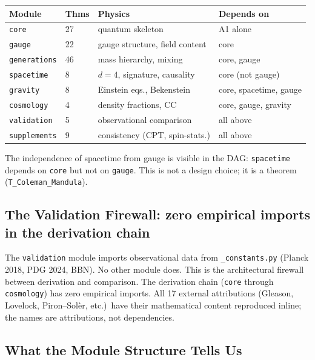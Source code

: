 \documentclass[11pt]{article}
\begin{document}
\smallskip
\begin{center}
\small
\begin{tabular}{llll}
\toprule
\textbf{Module} & \textbf{Thms} & \textbf{Physics} & \textbf{Depends on} \\
\midrule
\texttt{core} & 27 & quantum skeleton & A1 alone \\
\texttt{gauge} & 22 & gauge structure, field content & core \\
\texttt{generations} & 46 & mass hierarchy, mixing & core, gauge \\
\texttt{spacetime} & 8 & $d=4$, signature, causality & core (not gauge) \\
\texttt{gravity} & 8 & Einstein eqs., Bekenstein & core, spacetime, gauge \\
\texttt{cosmology} & 4 & density fractions, CC & core, gauge, gravity \\
\texttt{validation} & 5 & observational comparison & all above \\
\texttt{supplements} & 9 & consistency (CPT, spin-stats.) & all above \\
\bottomrule
\end{tabular}
\end{center}
\smallskip

The independence of spacetime from gauge is visible in the DAG: \texttt{spacetime} depends on \texttt{core} but not on \texttt{gauge}.  This is not a design choice; it is a theorem (\texttt{T\_Coleman\_Mandula}).


\subsection{The Validation Firewall: zero empirical imports in the derivation chain}

The \texttt{validation} module imports observational data from \texttt{\_constants.py} (Planck 2018, PDG 2024, BBN).  No other module does.  This is the architectural firewall between derivation and comparison.  The derivation chain (\texttt{core} through \texttt{cosmology}) has zero empirical imports.  All 17 external attributions (Gleason, Lovelock, Piron--Sol\`er, etc.)\ have their mathematical content reproduced inline; the names are attributions, not dependencies.


\subsection{What the Module Structure Tells Us}
\end{document}
